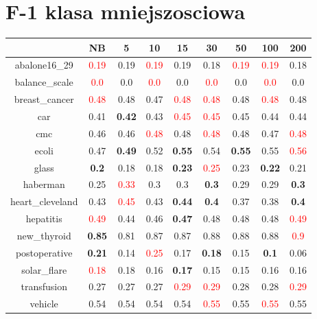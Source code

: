 \documentclass{article}%
\begin{document}
\section*{F{-}1 klasa mniejszosciowa}%
\begin{tabular}{c|cccccccc}%
\hline%
&NB&5&10&15&30&50&100&200\\%
\hline%
abalone16\_29&\textcolor{red}{ 
0.19
}&0.19&\textcolor{red}{ 
0.19
}&0.19&0.18&\textcolor{red}{ 
0.19
}&\textcolor{red}{ 
0.19
}&0.18\\%
\hline%
balance\_scale&\textcolor{red}{ 
0.0
}&0.0&\textcolor{red}{ 
0.0
}&0.0&\textcolor{red}{ 
0.0
}&0.0&\textcolor{red}{ 
0.0
}&0.0\\%
\hline%
breast\_cancer&\textcolor{red}{ 
0.48
}&0.48&0.47&\textcolor{red}{ 
0.48
}&\textcolor{red}{ 
0.48
}&0.48&\textcolor{red}{ 
0.48
}&0.48\\%
\hline%
car&0.41&\textbf{0.42}&0.43&\textcolor{red}{ 
0.45
}&\textcolor{red}{ 
0.45
}&0.45&0.44&0.44\\%
\hline%
cmc&0.46&0.46&\textcolor{red}{ 
0.48
}&0.48&\textcolor{red}{ 
0.48
}&0.48&0.47&\textcolor{red}{ 
0.48
}\\%
\hline%
ecoli&0.47&\textbf{0.49}&0.52&\textbf{0.55}&0.54&\textbf{0.55}&0.55&\textcolor{red}{ 
0.56
}\\%
\hline%
glass&\textbf{0.2}&0.18&0.18&\textbf{0.23}&\textcolor{red}{ 
0.25
}&0.23&\textbf{0.22}&0.21\\%
\hline%
haberman&0.25&\textcolor{red}{ 
0.33
}&0.3&0.3&\textbf{0.3}&0.29&0.29&\textbf{0.3}\\%
\hline%
heart\_cleveland&0.43&\textcolor{red}{ 
0.45
}&0.43&\textbf{0.44}&\textbf{0.4}&0.37&0.38&\textbf{0.4}\\%
\hline%
hepatitis&\textcolor{red}{ 
0.49
}&0.44&0.46&\textbf{0.47}&0.48&0.48&0.48&\textcolor{red}{ 
0.49
}\\%
\hline%
new\_thyroid&\textbf{0.85}&0.81&0.87&0.87&0.88&0.88&0.88&\textcolor{red}{ 
0.9
}\\%
\hline%
postoperative&\textbf{0.21}&0.14&\textcolor{red}{ 
0.25
}&0.17&\textbf{0.18}&0.15&\textbf{0.1}&0.06\\%
\hline%
solar\_flare&\textcolor{red}{ 
0.18
}&0.18&0.16&\textbf{0.17}&0.15&0.15&0.16&0.16\\%
\hline%
transfusion&0.27&0.27&0.27&\textcolor{red}{ 
0.29
}&\textcolor{red}{ 
0.29
}&0.28&0.28&\textcolor{red}{ 
0.29
}\\%
\hline%
vehicle&0.54&0.54&0.54&0.54&\textcolor{red}{ 
0.55
}&0.55&\textcolor{red}{ 
0.55
}&0.55\\%

\end{tabular}
\end{document}
